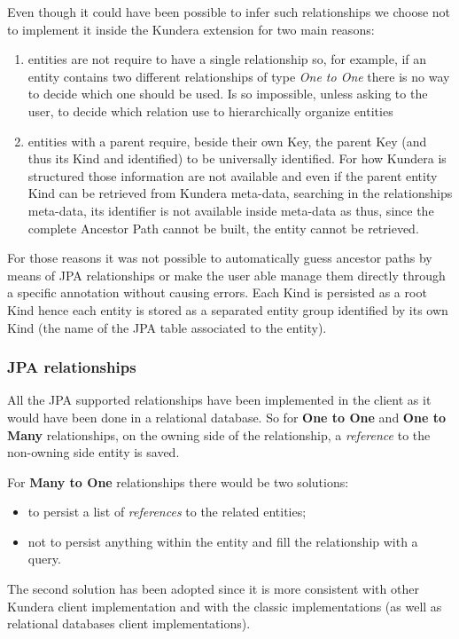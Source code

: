 \noindent Even though it could have been possible to infer such relationships we choose not to implement it inside the Kundera extension for two main reasons: 
\begin{enumerate}
\item entities are not require to have a single relationship so, for example, if an entity contains two different relationships of type \textit{One to One} there is no way to decide which one should be used. Is so impossible, unless asking to the user, to decide which relation use to hierarchically organize entities
\item entities with a parent require, beside their own Key, the parent Key (and thus its Kind and identified) to be universally identified. For how Kundera is structured those information are not available and even if the parent entity Kind can be retrieved from Kundera meta-data, searching in the relationships meta-data, its identifier is not available inside meta-data as thus, since the complete Ancestor Path cannot be built, the entity cannot be retrieved. 
\end{enumerate}
\noindent For those reasons it was not possible to automatically guess ancestor paths by means of JPA relationships or make the user able manage them directly through a specific annotation without causing errors.
Each Kind is persisted as a root Kind hence each entity is stored as a separated entity group identified by its own Kind (the name of the JPA table associated to the entity).

\subsubsection{JPA relationships}
All the JPA supported relationships have been implemented in the client as it would have been done in a relational database.
So for \textbf{One to One} and \textbf{One to Many} relationships, on the owning side of the relationship, a \textit{reference} to the non-owning side entity is saved.

\noindent For \textbf{Many to One} relationships there would be two solutions:
\begin{itemize}
\item to persist a list of \textit{references} to the related entities;
\item not to persist anything within the entity and fill the relationship with a query.
\end{itemize}
The second solution has been adopted since it is more consistent with other Kundera client implementation and with the classic implementations (as well as relational databases client implementations).

